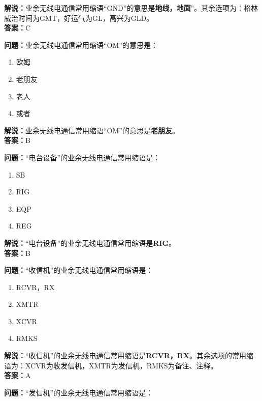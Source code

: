 \documentclass{ctexbook}
\begin{document}
\noindent\textbf{解说：}业余无线电通信常用缩语“GND”的意思是\textbf{地线，地面}”。其余选项为：格林威治时间为GMT，好运气为GL，高兴为GLD。\\\noindent\textbf{答案：}C


\bigskip


\noindent\textbf{问题：}业余无线电通信常用缩语“OM”的意思是：

\begin{enumerate}[label=\Alph*), leftmargin=3em]
	\item 欧姆
	\item 老朋友
	\item 老人
	\item 或者
\end{enumerate}

\noindent\textbf{解说：}业余无线电通信常用缩语“OM”的意思是\textbf{老朋友}。\\\noindent\textbf{答案：}B


\bigskip


\noindent\textbf{问题：}“电台设备”的业余无线电通信常用缩语是：

\begin{enumerate}[label=\Alph*), leftmargin=3em]
	\item SB
	\item RIG
	\item EQP
	\item REG
\end{enumerate}

\noindent\textbf{解说：}“电台设备”的业余无线电通信常用缩语是\textbf{RIG}。\\\noindent\textbf{答案：}B


\bigskip


\noindent\textbf{问题：}“收信机”的业余无线电通信常用缩语是：

\begin{enumerate}[label=\Alph*), leftmargin=3em]
	\item RCVR，RX
	\item XMTR
	\item XCVR
	\item RMKS
\end{enumerate}

\noindent\textbf{解说：}“收信机”的业余无线电通信常用缩语是\textbf{RCVR，RX}。其余选项的常用缩语为：XCVR为收发信机，XMTR为发信机，RMKS为备注、注释。\\\noindent\textbf{答案：}A


\bigskip


\noindent\textbf{问题：}“发信机”的业余无线电通信常用缩语是：
\end{document}
